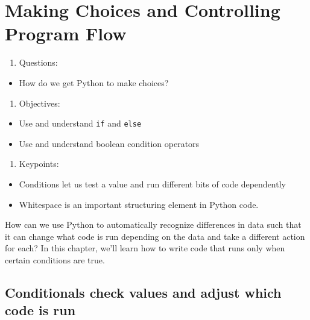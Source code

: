 \documentclass[]{book}
\providecommand{\tightlist}{%
  \setlength{\itemsep}{0pt}\setlength{\parskip}{0pt}}
\theoremstyle{definition}
\theoremstyle{definition}
\theoremstyle{definition}
\theoremstyle{remark}
\begin{document}
\hypertarget{making-choices-and-controlling-program-flow}{%
\chapter{Making Choices and Controlling Program
Flow}\label{making-choices-and-controlling-program-flow}}

\begin{enumerate}
\def\labelenumi{\arabic{enumi}.}
\tightlist
\item
  Questions:
\end{enumerate}

\begin{itemize}
\tightlist
\item
  How do we get Python to make choices?
\end{itemize}

\begin{enumerate}
\def\labelenumi{\arabic{enumi}.}
\setcounter{enumi}{1}
\tightlist
\item
  Objectives:
\end{enumerate}

\begin{itemize}
\tightlist
\item
  Use and understand \texttt{if} and \texttt{else}
\item
  Use and understand boolean condition operators
\end{itemize}

\begin{enumerate}
\def\labelenumi{\arabic{enumi}.}
\setcounter{enumi}{2}
\tightlist
\item
  Keypoints:
\end{enumerate}

\begin{itemize}
\tightlist
\item
  Conditions let us test a value and run different bits of code
  dependently
\item
  Whitespace is an important structuring element in Python code.
\end{itemize}

How can we use Python to automatically recognize differences in data
such that it can change what code is run depending on the data and take
a different action for each? In this chapter, we'll learn how to write
code that runs only when certain conditions are true.

\hypertarget{conditionals-check-values-and-adjust-which-code-is-run}{%
\section{Conditionals check values and adjust which code is
run}\label{conditionals-check-values-and-adjust-which-code-is-run}}
\end{document}
